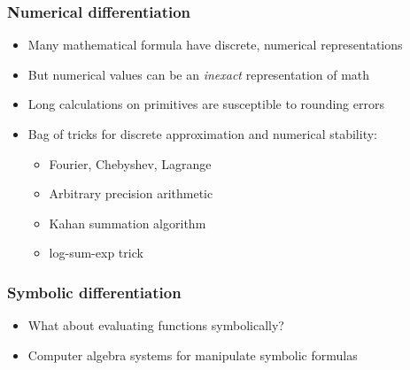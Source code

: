 \documentclass{beamer}
\begin{document}

    \begin{frame}
        \frametitle{Numerical differentiation}
        \begin{itemize}
            \item Many mathematical formula have discrete, numerical representations
            \item But numerical values can be an \textit{inexact} representation of math
            \item Long calculations on primitives are susceptible to rounding errors
            \item Bag of tricks for discrete approximation and numerical stability:
            \begin{itemize}
                \item Fourier, Chebyshev, Lagrange
                \item Arbitrary precision arithmetic
                \item Kahan summation algorithm
                \item log-sum-exp trick
            \end{itemize}
        \end{itemize}
    \end{frame}


    \begin{frame}
        \frametitle{Symbolic differentiation}
        \begin{itemize}
            \item What about evaluating functions symbolically?
            \item Computer algebra systems for manipulate symbolic formulas
        \end{itemize}
    \end{frame}

\end{document}
